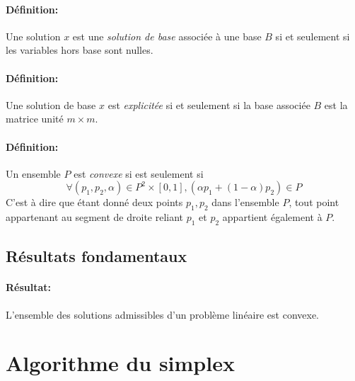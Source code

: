 \documentclass[a4paper]{report}
\begin{document}
\paragraph{Définition:}Une solution \(x\) est une \emph{solution de base}
associée à une base \(B\) si et seulement si les variables hors base sont
nulles.
\paragraph{Définition:}Une solution de base \(x\) est \emph{explicitée} si et
seulement si la base associée \(B\) est la matrice unité \(m\times m\).
\paragraph{Définition:}Un ensemble \(P\) est \emph{convexe} si est seulement
si
\[\forall (p_1,p_2,\alpha)\in P^2\times[0,1],(\alpha p_1+(1-\alpha)p_2)\in P\]
C'est à dire que étant donné deux points \(p_1,p_2\) dans l'ensemble \(P\),
tout point appartenant au segment de droite reliant \(p_1\) et \(p_2\)
appartient également à \(P\).

\subsection{Résultats fondamentaux}
\paragraph{Résultat:} L'ensemble des solutions admissibles d'un problème
linéaire est convexe.

\section{Algorithme du simplex}
\end{document}
